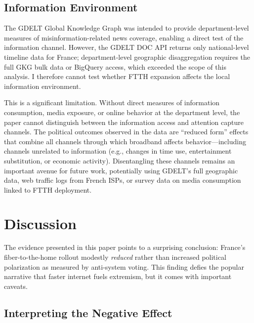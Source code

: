 \documentclass[12pt]{article}
\begin{document}


\subsection{Information Environment}

The GDELT Global Knowledge Graph was intended to provide department-level measures of misinformation-related news coverage, enabling a direct test of the information channel. However, the GDELT DOC API returns only national-level timeline data for France; department-level geographic disaggregation requires the full GKG bulk data or BigQuery access, which exceeded the scope of this analysis. I therefore cannot test whether FTTH expansion affects the local information environment.

This is a significant limitation. Without direct measures of information consumption, media exposure, or online behavior at the department level, the paper cannot distinguish between the information access and attention capture channels. The political outcomes observed in the data are ``reduced form'' effects that combine all channels through which broadband affects behavior---including channels unrelated to information (e.g., changes in time use, entertainment substitution, or economic activity). Disentangling these channels remains an important avenue for future work, potentially using GDELT's full geographic data, web traffic logs from French ISPs, or survey data on media consumption linked to FTTH deployment.



\section{Discussion}\label{sec:discussion}

The evidence presented in this paper points to a surprising conclusion: France's fiber-to-the-home rollout modestly \emph{reduced} rather than increased political polarization as measured by anti-system voting. This finding defies the popular narrative that faster internet fuels extremism, but it comes with important caveats.

\subsection{Interpreting the Negative Effect}
\end{document}
